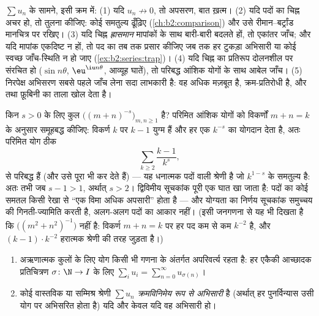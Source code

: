 \begin{method}[कौन-सी जाँच चुनें]\label{met:b2:series:choosing}
$\sum u_n$ के सामने, इसी क्रम में: (1) यदि $u_n \not\to 0$, तो अपसरण, बात ख़त्म। (2) यदि
पदों का चिह्न अचर हो, तो तुलना कीजिए: कोई समतुल्य ढूँढ़िए (\cref{ch:b2:comparison}) और उसे
रीमान--बर्ट्रांड मानचित्र पर रखिए। (3) यदि चिह्न \emph{ह्रासमान}
मापांकों के साथ बारी-बारी बदलते हों, तो एकांतर जाँच; और यदि मापांक
एकदिष्ट न हों, तो पद का तब तक प्रसार कीजिए जब तक हर टुकड़ा  अभिसारी या कोई स्वच्छ जाँच-स्थिति न हो जाए (\cref{ex:b2:series:trap})। (4) यदि चिह्न का
प्रतिरूप दोलनशील पर संरचित हो ($\sin
n\theta$, $\eu^{\iu n\theta}$, आव्यूह घातें), तो परिबद्ध
आंशिक योगों के साथ आबेल जाँच। (5) निरपेक्ष अभिसरण सबसे पहले जाँच लेना
सदा लाभकारी है: वह अधिक मज़बूत है, क्रम-प्रतिरोधी है, और  तथा
फ़ूबिनी का ताला खोल देता है।
\end{method}

\begin{example}[विकर्ण गिनती से योग्यता]\label{ex:b2:series:diagonalcount}
किन $s > 0$ के लिए कुल $\bigl((m + n)^{-s}\bigr)_{m, n \geq 1}$  है? परिमित आंशिक योगों को विकर्णों $m + n = k$ के
अनुसार समूहबद्ध कीजिए: विकर्ण $k$ पर $k - 1$ युग्म हैं और हर एक $k^{-s}$ का
योगदान देता है, अतः परिमित योग ठीक
\[
\sum_{k \geq 2} \frac{k - 1}{k^{s}} ,
\]
से परिबद्ध हैं (और उसे पूरा भी कर देते हैं) --- यह धनात्मक पदों वाली
श्रेणी है जो $k^{1-s}$ के समतुल्य है: अतः  तभी जब $s - 1 > 1$, अर्थात् $s > 2$।
द्विविमीय सूचकांक पूरी एक घात खा जाता है: पदों का कोई समतल किसी रेखा से
``एक विमा अधिक अपसारी'' होता है --- और योग्यता का निर्णय सूचकांक समुच्चय
की गिनती-ज्यामिति करती है, अलग-अलग पदों का आकार नहीं। (इसी जनगणना से यह
भी दिखता है कि $\bigl((m^2 + n^2)^{-1}\bigr)$  नहीं है: विकर्ण $m + n = k$ पर हर पद कम से कम $k^{-2}$ है,
और $(k-1)\cdot k^{-2}$ हरात्मक श्रेणी की तरह जुड़ता है।)
\end{example}

\begin{theorem}[योग्यता और क्रम]\label{thm:b2:series:rearrangement}
\begin{enumerate}
  \item अऋणात्मक कुलों के लिए योग किसी भी गणना के अंतर्गत अपरिवर्त्य
        रहता है: हर एकैकी आच्छादक प्रतिचित्रण $\sigma \colon \N \to I$ के लिए $\sum_{i} u_i = \sum_{n=0}^{\infty}
        u_{\sigma(n)}$।
  \item कोई वास्तविक या सम्मिश्र श्रेणी $\sum u_n$ \emph{क्रमविनिमेय रूप से
        अभिसारी} है (अर्थात् हर पुनर्विन्यास उसी योग पर अभिसरित होता
        है) यदि और केवल यदि वह  अभिसारी हो।
\end{enumerate}
\end{theorem}


